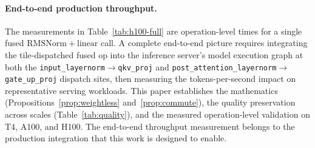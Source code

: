 \documentclass{article}
\begin{document}
\paragraph{End-to-end production throughput.} The measurements in Table~\ref{tab:h100-full} are operation-level times for a single fused $\mathrm{RMSNorm}+\mathrm{linear}$ call. A complete end-to-end picture requires integrating the tile-dispatched fused op into the inference server's model execution graph at both the \texttt{input\_layernorm}$\to$\texttt{qkv\_proj} and \texttt{post\_attention\_layernorm}$\to$\texttt{gate\_up\_proj} dispatch sites, then measuring the tokens-per-second impact on representative serving workloads. This paper establishes the mathematics (Propositions~\ref{prop:weightless} and~\ref{prop:commute}), the quality preservation across scales (Table~\ref{tab:quality}), and the measured operation-level validation on T4, A100, and H100. The end-to-end throughput measurement belongs to the production integration that this work is designed to enable.



\end{document}

